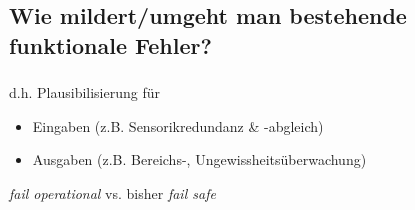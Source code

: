 \subsection{Wie mildert/umgeht man bestehende funktionale Fehler?}

\begin{frame}\frametitle<presentation>{\insertsubsection}
  \begin{description}[]
  \item[Überwachung] d.h. Plausibilisierung für
    \begin{itemize}[<.->]
    \item Eingaben (z.B. Sensorikredundanz \& -abgleich)
    \item Ausgaben (z.B. Bereichs-, Ungewissheitsüberwachung)
    \end{itemize}
  \item[Redundanz]
  \item[Backup-/Fallback-System(e)]
    \emph{fail operational} vs. bisher \emph{fail safe}
  \end{description}
\end{frame}

